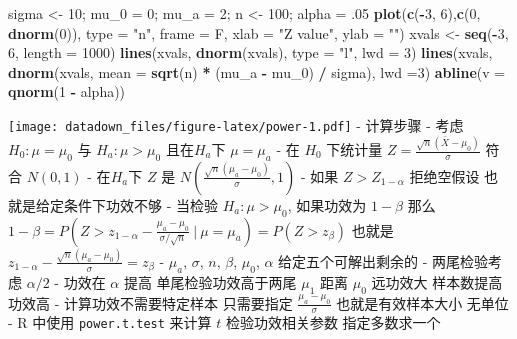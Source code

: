 \documentclass[]{book}
\newenvironment{Shaded}{\begin{snugshade}}{\end{snugshade}}
\newcommand{\DataTypeTok}[1]{\textcolor[rgb]{0.13,0.29,0.53}{#1}}
\newcommand{\DecValTok}[1]{\textcolor[rgb]{0.00,0.00,0.81}{#1}}
\newcommand{\FloatTok}[1]{\textcolor[rgb]{0.00,0.00,0.81}{#1}}
\newcommand{\KeywordTok}[1]{\textcolor[rgb]{0.13,0.29,0.53}{\textbf{#1}}}
\newcommand{\NormalTok}[1]{#1}
\newcommand{\OperatorTok}[1]{\textcolor[rgb]{0.81,0.36,0.00}{\textbf{#1}}}
\newcommand{\StringTok}[1]{\textcolor[rgb]{0.31,0.60,0.02}{#1}}
\begin{document}
\begin{Shaded}
\begin{Highlighting}[]
\NormalTok{sigma <-}\StringTok{ }\DecValTok{10}\NormalTok{; mu_}\DecValTok{0}\NormalTok{ =}\StringTok{ }\DecValTok{0}\NormalTok{; mu_a =}\StringTok{ }\DecValTok{2}\NormalTok{; n <-}\StringTok{ }\DecValTok{100}\NormalTok{; alpha =}\StringTok{ }\FloatTok{.05}
\KeywordTok{plot}\NormalTok{(}\KeywordTok{c}\NormalTok{(}\OperatorTok{-}\DecValTok{3}\NormalTok{, }\DecValTok{6}\NormalTok{),}\KeywordTok{c}\NormalTok{(}\DecValTok{0}\NormalTok{, }\KeywordTok{dnorm}\NormalTok{(}\DecValTok{0}\NormalTok{)), }\DataTypeTok{type =} \StringTok{"n"}\NormalTok{, }\DataTypeTok{frame =}\NormalTok{ F, }\DataTypeTok{xlab =} \StringTok{"Z value"}\NormalTok{, }\DataTypeTok{ylab =} \StringTok{""}\NormalTok{)}
\NormalTok{xvals <-}\StringTok{ }\KeywordTok{seq}\NormalTok{(}\OperatorTok{-}\DecValTok{3}\NormalTok{, }\DecValTok{6}\NormalTok{, }\DataTypeTok{length =} \DecValTok{1000}\NormalTok{)}
\KeywordTok{lines}\NormalTok{(xvals, }\KeywordTok{dnorm}\NormalTok{(xvals), }\DataTypeTok{type =} \StringTok{"l"}\NormalTok{, }\DataTypeTok{lwd =} \DecValTok{3}\NormalTok{)}
\KeywordTok{lines}\NormalTok{(xvals, }\KeywordTok{dnorm}\NormalTok{(xvals, }\DataTypeTok{mean =} \KeywordTok{sqrt}\NormalTok{(n) }\OperatorTok{*}\StringTok{ }\NormalTok{(mu_a }\OperatorTok{-}\StringTok{ }\NormalTok{mu_}\DecValTok{0}\NormalTok{) }\OperatorTok{/}\StringTok{ }\NormalTok{sigma), }\DataTypeTok{lwd =}\DecValTok{3}\NormalTok{)}
\KeywordTok{abline}\NormalTok{(}\DataTypeTok{v =} \KeywordTok{qnorm}\NormalTok{(}\DecValTok{1} \OperatorTok{-}\StringTok{ }\NormalTok{alpha))}
\end{Highlighting}
\end{Shaded}

\texttt{[image: datadown\_files/figure-latex/power-1.pdf]}
- 计算步骤
- 考虑 \(H_0 : \mu = \mu_0\) 与 \(H_a : \mu > \mu_0\) 且在\(H_a\)下 \(\mu = \mu_a\)
- 在 \(H_0\) 下统计量 \(Z = \frac{\sqrt{n}(\bar X - \mu_0)}{\sigma}\) 符合 \(N(0, 1)\)
- 在\(H_a\)下 \(Z\) 是 \(N\left( \frac{\sqrt{n}(\mu_a - \mu_0)}{\sigma}, 1\right)\)
- 如果 \(Z > Z_{1-\alpha}\) 拒绝空假设 也就是给定条件下功效不够
- 当检验 \(H_a : \mu > \mu_0\), 如果功效为 \(1 - \beta\) 那么
\(1 - \beta = P\left(Z > z_{1-\alpha} - \frac{\mu_a - \mu_0}{\sigma /\sqrt{n}} ~|~ \mu = \mu_a \right) = P(Z > z_{\beta})\) 也就是 \(z_{1-\alpha} - \frac{\sqrt{n}(\mu_a - \mu_0)}{\sigma} = z_{\beta}\)
- \(\mu_a\), \(\sigma\), \(n\), \(\beta\), \(\mu_0\), \(\alpha\) 给定五个可解出剩余的
- 两尾检验考虑 \(\alpha / 2\)
- 功效在 \(\alpha\) 提高 单尾检验功效高于两尾 \(\mu_1\) 距离 \(\mu_0\) 远功效大 样本数提高功效高
- 计算功效不需要特定样本 只需要指定 \(\frac{\mu_a - \mu_0}{\sigma}\) 也就是有效样本大小 无单位
- R 中使用 \texttt{power.t.test} 来计算 \(t\) 检验功效相关参数 指定多数求一个
\end{document}
